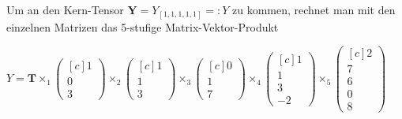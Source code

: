 \documentclass[11pt]{article} %
\renewcommand{\_}{\rule{0.2cm}{.5pt}}
\begin{document}
Um an den Kern-Tensor $\mathbf{Y} = Y_{[1,1,1,1,1]} =: Y$ zu kommen, rechnet man mit den einzelnen Matrizen das 5-stufige Matrix-Vektor-Produkt

$Y = \mathbf{T} \times_{1} 
\begin{pmatrix}[c]
  1 \\
  0 \\
  3 
\end{pmatrix} \times_{2}
\begin{pmatrix}[c]
  1 \\
  1 \\
  3 
\end{pmatrix} \times_{3}
\begin{pmatrix}[c]
  0 \\
  1 \\
  7 
\end{pmatrix} \times_{4}
\begin{pmatrix}[c]
  1 \\
  1 \\
  3 \\
  -2
\end{pmatrix} \times_{5}
\begin{pmatrix}[c]
  2 \\
  7 \\
  6 \\
  0 \\
  8
\end{pmatrix}
$
\end{document}
